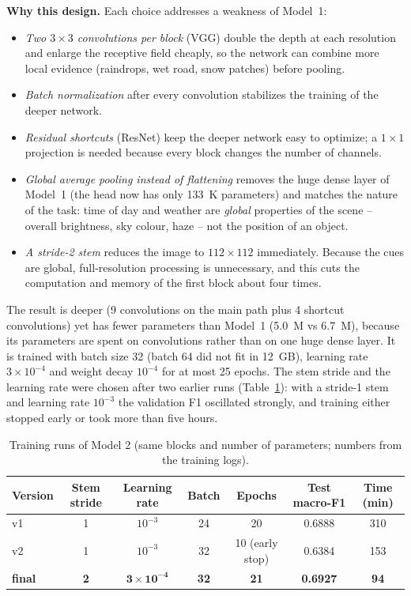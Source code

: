 \documentclass[12pt,letterpaper]{article}
\begin{document}
\textbf{Why this design.} Each choice addresses a weakness of Model~1:
\begin{itemize}
  \item \emph{Two $3\times3$ convolutions per block} (VGG) double the depth at each resolution and enlarge the
        receptive field cheaply, so the network can combine more local evidence (raindrops, wet road, snow patches)
        before pooling.
  \item \emph{Batch normalization} after every convolution stabilizes the training of the deeper network.
  \item \emph{Residual shortcuts} (ResNet) keep the deeper network easy to optimize; a $1\times1$ projection is needed
        because every block changes the number of channels.
  \item \emph{Global average pooling instead of flattening} removes the huge dense layer of Model~1 (the head now has
        only 133~K parameters) and matches the nature of the task: time of day and weather are \emph{global}
        properties of the scene -- overall brightness, sky colour, haze -- not the position of an object.
  \item \emph{A stride-2 stem} reduces the image to $112\times112$ immediately. Because the cues are global,
        full-resolution processing is unnecessary, and this cuts the computation and memory of the first block about
        four times.
\end{itemize}
The result is deeper (9 convolutions on the main path plus 4 shortcut convolutions) yet has fewer parameters than
Model~1 (5.0~M vs 6.7~M), because its parameters are spent on convolutions rather than on one huge dense layer. It is
trained with batch size 32 (batch 64 did not fit in 12~GB), learning rate $3\times10^{-4}$ and weight decay $10^{-4}$
for at most 25 epochs. The stem stride and the learning rate were chosen after two earlier runs (Table~\ref{tab:iter}):
with a stride-1 stem and learning rate $10^{-3}$ the validation F1 oscillated strongly, and training either stopped
early or took more than five hours.

\begin{table}[htbp]
\centering\small
\caption{Training runs of Model 2 (same blocks and number of parameters; numbers from the training logs).}
\label{tab:iter}
\begin{tabular}{lcccccc}
\toprule
Version & Stem stride & Learning rate & Batch & Epochs & Test macro-F1 & Time (min) \\
\midrule
v1 & 1 & $10^{-3}$ & 24 & 20 & 0.6888 & 310 \\
v2 & 1 & $10^{-3}$ & 32 & 10 (early stop) & 0.6384 & 153 \\
\textbf{final} & \textbf{2} & $\mathbf{3\times10^{-4}}$ & \textbf{32} & \textbf{21} & \textbf{0.6927} & \textbf{94} \\
\bottomrule
\end{tabular}
\end{table}
\end{document}
